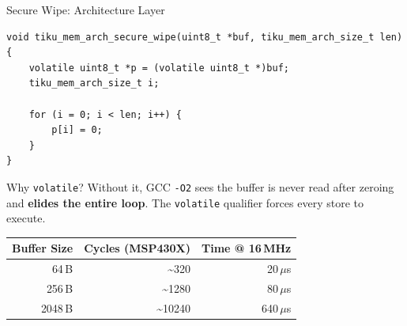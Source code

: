 \documentclass[aspectratio=169, 10pt]{beamer}
\begin{document}
\begin{frame}[fragile]{Secure Wipe: Architecture Layer}
\begin{lstlisting}[style=cstyle, title={arch/msp430/tiku\_mem\_arch.c}]
void tiku_mem_arch_secure_wipe(uint8_t *buf, tiku_mem_arch_size_t len)
{
    volatile uint8_t *p = (volatile uint8_t *)buf;
    tiku_mem_arch_size_t i;

    for (i = 0; i < len; i++) {
        p[i] = 0;
    }
}
\end{lstlisting}

\vspace{0.3em}
\begin{alertblock}{Why \texttt{volatile}?}
Without it, GCC \texttt{-O2} sees the buffer is never read after zeroing and
\textbf{elides the entire loop}. The \texttt{volatile} qualifier forces every
store to execute.
\end{alertblock}

\vspace{0.3em}
\begin{table}
\centering
\small
\begin{tabular}{@{}rrr@{}}
\toprule
\textbf{Buffer Size} & \textbf{Cycles (MSP430X)} & \textbf{Time @ 16\,MHz} \\
\midrule
64\,B   &   \textasciitilde320  & 20\,$\mu$s  \\
256\,B  &  \textasciitilde1280  & 80\,$\mu$s  \\
2048\,B & \textasciitilde10240  & 640\,$\mu$s \\
\bottomrule
\end{tabular}
\end{table}
\end{frame}
\end{document}
